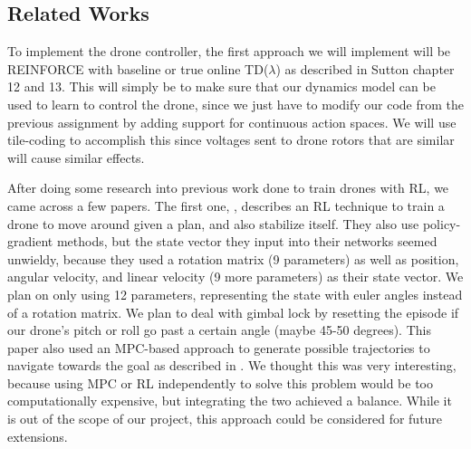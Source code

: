 \documentclass{article}
\begin{document}

\subsection{Related Works}

To implement the drone controller, the first approach we will implement will be REINFORCE with baseline or true online TD($\lambda$) as described in Sutton \cite{sutton} chapter 12 and 13. This will simply be to make sure that our dynamics model can be used to learn to control the drone, since we just have to modify our code from the previous assignment by adding support for continuous action spaces. We will use tile-coding to accomplish this since voltages sent to drone rotors that are similar will cause similar effects.

After doing some research into previous work done to train drones with RL, we came across a few papers. The first one, \cite{quadrl}, describes an RL technique to train a drone to move around given a plan, and also stabilize itself. They also use policy-gradient methods, but the state vector they input into their networks seemed unwieldy, because they used a rotation matrix (9 parameters) as well as position, angular velocity, and linear velocity (9 more parameters) as their state vector. We plan on only using 12 parameters, representing the state with euler angles instead of a rotation matrix. We plan to deal with gimbal lock by resetting the episode if our drone's pitch or roll go past a certain angle (maybe 45-50 degrees). This paper also used an MPC-based approach to generate possible trajectories to navigate towards the goal as described in \cite{abbeel}. We thought this was very interesting, because using MPC or RL independently to solve this problem would be too computationally expensive, but integrating the two achieved a balance. While it is out of the scope of our project, this approach could be considered for future extensions.
\end{document}
